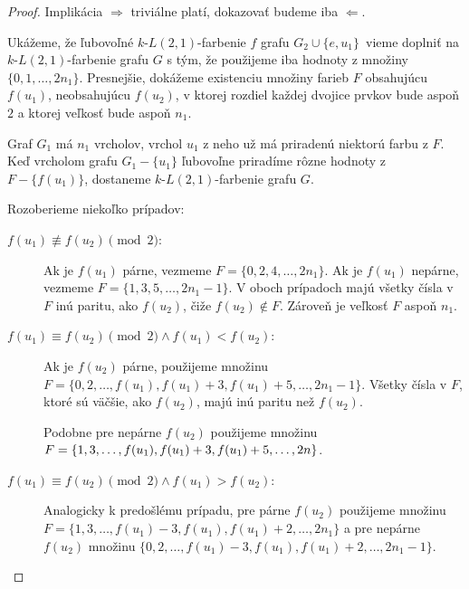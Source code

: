 \begin{proof}
    Implikácia $\boxed{\Rightarrow}$ triviálne platí, dokazovať budeme iba $\boxed{\Leftarrow}$.

    Ukážeme, že ľubovoľné $k$-$L(2,1)$-farbenie $f$ grafu $G_2 \cup \{e, u_1\}$ vieme doplniť na
    $k$-$L(2,1)$-farbenie grafu $G$ s tým, že použijeme iba hodnoty z množiny $\{0, 1, \ldots, 2n_1\}$.
    Presnejšie, dokážeme existenciu množiny farieb $F$ obsahujúcu $f(u_1)$, neobsahujúcu $f(u_2)$,
    v ktorej rozdiel každej dvojice prvkov bude aspoň $2$ a ktorej veľkosť bude aspoň $n_1$.
    
    Graf $G_1$ má $n_1$ vrcholov, vrchol $u_1$ z neho už má priradenú niektorú farbu z $F$. Keď vrcholom
    grafu $G_1 - \{u_1\}$ ľubovoľne priradíme rôzne hodnoty z $F - \{f(u_1)\}$, dostaneme $k$-$L(2,1)$-farbenie
    grafu $G$.

    Rozoberieme niekoľko prípadov:

    \begin{description}
        \item[$\boxed{f(u_1) \not\equiv f(u_2) \pmod{2}}:$] 
            Ak je $f(u_1)$ párne, vezmeme $F = \{0, 2, 4, \ldots, 2n_1\}$.
            Ak je $f(u_1)$ nepárne, vezmeme $F = \{1, 3, 5, \ldots, 2n_1 - 1\}$. V oboch prípadoch majú všetky
            čísla v $F$ inú paritu, ako $f(u_2)$, čiže $f(u_2) \notin F$. Zároveň je veľkosť $F$ aspoň $n_1$.

        \item[$\boxed{f(u_1) \equiv f(u_2) \pmod{2} \wedge f(u_1) < f(u_2)}:$]
            Ak je $f(u_2)$ párne, použijeme množinu
            $F = \{0, 2, \ldots, f(u_1), f(u_1) + 3, f(u_1) + 5, \ldots, 2n_1 - 1\}$. Všetky čísla v $F$, ktoré sú
            väčšie, ako $f(u_2)$, majú inú paritu než $f(u_2)$.

            Podobne pre nepárne $f(u_2)$ použijeme množinu $F = \{1, 3, \ldots, f(u_1), f(u_1) + 3, \\ f(u_1) + 5, \ldots, 2n\}$.

        \item[$\boxed{f(u_1) \equiv f(u_2) \pmod{2} \wedge f(u_1) > f(u_2)}:$]
            Analogicky k predošlému prípadu, pre párne $f(u_2)$ použijeme množinu $F = \{1, 3, \ldots, f(u_1) - 3, f(u_1), f(u_1) + 2, \ldots, 2n_1\}$
            a pre nepárne $f(u_2)$ množinu $\{0, 2, \ldots, f(u_1) - 3, f(u_1), f(u_1) + 2, \ldots, 2n_1 - 1\}$. \qedhere
    \end{description}
\end{proof}


